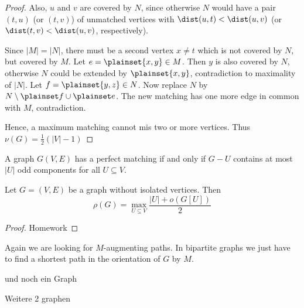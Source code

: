 \begin{proof}
	Also, $u$ and $v$ are covered by $N$, since otherwise $N$ would have a pair
	$(t,u)$ (or $(t,v)$) of unmatched vertices with $\dist(u,t) < \dist (u,v)$ 
	(or $\dist(t,v) < \dist(u,v)$, respectively).
	
	Since $|M| = |N|$, there must be a second vertex $x\neq t$ which is not
	covered by $N$, but covered by $M$. Let $e=\plainset{x,y} \in M$. Then $y$ is
	also covered by $N$, otherwise $N$ could be extended by $\plainset{x,y}$, 
	contradiction to maximality of $|N|$. Let $f=\plainset{y,z}\in N$. Now
	replace $N$ by $N \setminus \plainset f \cup \plainset e$. The new matching 
	has one more edge in common with $M$, contradiction.
	
	Hence, a maximum matching cannot mis two or more vertices. Thus $\nu (G) = 
	\frac12(|V|-1)$
	
\end{proof}

\begin{cor}
	A graph $G(V,E)$ has a perfect matching if and only if $G - U$ contains at
	most $|U|$ odd components for all $U \subseteq V$.
\end{cor}

\begin{cor}
	Let $G = (V,E)$ be a graph without isolated vertices. Then \[
		\rho(G) = \max_{U \subseteq V} \frac{|U| + o(G[U])}2
	\]
\end{cor}

\begin{proof}
	Homework
\end{proof}

	Again we are looking for $M$-augmenting paths. In bipartite graphs we just have 
	to find a shortest path in the orientation of $G$ by $M$. 
	
\begin{xmp+}
und noch ein Graph
\end{xmp+}

\begin{xmp+}
	Weitere 2 graphen
\end{xmp+}

